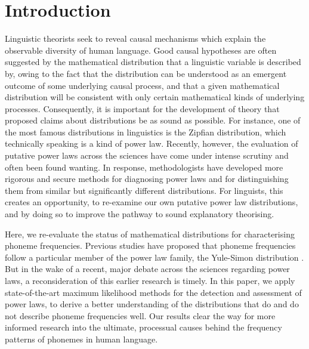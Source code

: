 \hypertarget{phon-freq-intro}{%
\section{Introduction}\label{phon-freq-intro}}

Linguistic theorists seek to reveal causal mechanisms which explain the observable diversity of human language. Good causal hypotheses are often suggested by the mathematical distribution that a linguistic variable is described by, owing to the fact that the distribution can be understood as an emergent outcome of some underlying causal process, and that a given mathematical distribution will be consistent with only certain mathematical kinds of underlying processes. Consequently, it is important for the development of theory that proposed claims about distributions be as sound as possible. For instance, one of the most famous distributions in linguistics is the Zipfian distribution, which technically speaking is a kind of power law. Recently, however, the evaluation of putative power laws across the sciences have come under intense scrutiny and often been found wanting. In response, methodologists have developed more rigorous and secure methods for diagnosing power laws and for distinguishing them from similar but significantly different distributions. For linguists, this creates an opportunity, to re-examine our own putative power law distributions, and by doing so to improve the pathway to sound explanatory theorising.

Here, we re-evaluate the status of mathematical distributions for characterising phoneme frequencies. Previous studies have proposed that phoneme frequencies follow a particular member of the power law family, the Yule-Simon distribution \autocites{martindale_comparison_1996}{tambovtsev_phoneme_2007}. But in the wake of a recent, major debate across the sciences regarding power laws, a reconsideration of this earlier research is timely. In this paper, we apply state-of-the-art maximum likelihood methods for the detection and assessment of power laws, to derive a better understanding of the distributions that do and do not describe phoneme frequencies well. Our results clear the way for more informed research into the ultimate, processual causes behind the frequency patterns of phonemes in human language.

